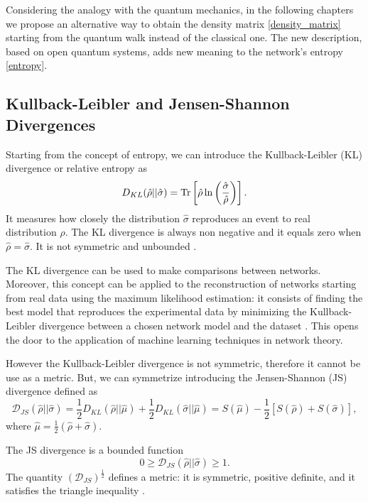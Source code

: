 Considering the analogy with the quantum mechanics, in the following chapters we propose an alternative way to obtain the density matrix \eqref{density_matrix} starting from the quantum walk instead of the classical one. The new description, based on open quantum systems, adds new meaning to the network's entropy \eqref{entropy}.

\subsection{Kullback-Leibler and Jensen-Shannon Divergences}
Starting from the concept of entropy, we can introduce the Kullback-Leibler (KL) divergence or relative entropy \cite{K-L_divergence} as
\begin{equation}\label{KL_divergence}
    D_{KL}(\hat \rho || \hat \sigma) = \operatorname{Tr} \left[\hat \rho \ln\left(\frac{\hat\sigma}{\hat\rho}\right)\right].
\end{equation}
It measures how closely the distribution $\hat \sigma$ reproduces an event to real distribution $\hat \rho$. 
The KL divergence is always non negative and it equals zero when $\hat \rho = \hat \sigma$. It is not symmetric and unbounded \cite{J-S_divergence}.

The KL divergence can be used to make comparisons between networks. Moreover, this concept can be applied to the reconstruction of networks starting from real data using the maximum likelihood estimation: it consists of finding the best model that reproduces the experimental data by minimizing the Kullback-Leibler divergence between a chosen network model and the dataset \cite{De_Domenico_2016}. This opens the door to the application of machine learning techniques in network theory.

However the Kullback-Leibler divergence is not symmetric, therefore it cannot be use as a metric. 
But, we can symmetrize introducing the Jensen-Shannon (JS) divergence \cite{J-S_divergence} defined as
\begin{equation}\label{JS_metric}
    \mathcal{D}_{JS}(\hat\rho||\hat\sigma) =  \frac{1}{2}D_{KL}(\hat \rho || \hat \mu) + \frac{1}{2}D_{KL}(\hat \sigma || \hat \mu) = S(\hat\mu)-\frac{1}{2}\left[S(\hat\rho) + S(\hat\sigma)\right],
\end{equation}
where $\hat\mu =\frac{1}{2}(\hat\rho+\hat\sigma)$. 

The JS divergence is a bounded function \cite{J-S_divergence}
\begin{equation}
    0 \geq \mathcal{D}_{JS}(\hat\rho||\hat\sigma) \geq 1.
\end{equation}
The quantity $\left(\mathcal{D}_{JS}\right)^{\frac{1}{2}}$ defines a metric: it is symmetric, positive definite, and it satisfies the triangle inequality \cite{Jensen-Shannon_divergence}. 

